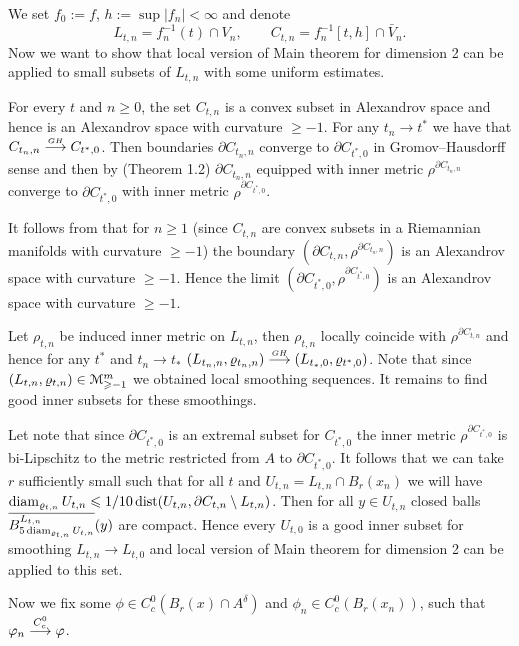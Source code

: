 We set $f_0:=f$, $h:=\sup |f_n|<\infty$
and denote 
$$L_{t,n}=f_n^{-1}(t)\cap V_n,\qquad
C_{t,n}=f_n^{-1}[t,h]\cap \bar V_n.$$
 Now we want to show that local version of
Main theorem  for dimension 2 can be applied to small subsets of $L_{t,n}$ with some uniform estimates.



For every $t$ and $n\ge 0$, the set $C_{t,n}$ is a convex subset in Alexandrov space 
 and hence is an Alexandrov space 
 with curvature $\ge -1$.
For any $t_n\to t^*$ we have that
$C_{t_n,n}     \stackrel{\hbox{\tiny $GH$}}{\longrightarrow}    C_{t^*,0} $. 
Then boundaries  $\partial C_{t_n,n}  $
  converge to $\partial C_{t^*,0}  $ in
Gromov--Hausdorff sense and then by  
  \cite{petrunin-QG} (Theorem 1.2)
 $\partial C_{t_n, n}  $ equipped with inner metric
 $\rho^{\partial C_{t_n,n}}$ converge to
 $\partial C_{t^*,0}  $ with inner metric
 $\rho^{\partial C_{t^*,0}}$.
 
 
 It follows from \cite{AKP} that
 for $n\ge 1$
  (since $C_{t,n}$ are
 convex subsets in a Riemannian manifolds with curvature $\ge -1$)
  the boundary
$(\partial C_{t,n}, \rho^{\partial C_{t_n,n}}) $ is
an Alexandrov space 
 with curvature $\ge -1$. Hence the limit
$(\partial C_{t^*,0}, \rho^{\partial C_{t^*,0}}) $ is
an Alexandrov space 
 with curvature $\ge -1$.

Let $\rho_{t,n}$ be induced inner metric on $L_{t,n}$,
then $\rho_{t,n}$ locally coincide with
$\rho^{\partial C_{t,n}}$ and hence 
for any $t^*$ and $t_n\to t_*$
$(L_{t_n,n}, \varrho_{t_n,n})\stackrel{\hbox{\tiny $GH$}}{\longrightarrow} (L_{t_*,0},\varrho_{t^*,0} )$.
Note that since $(L_{t,n}, \varrho_{t,n})\in\mathcal M_{\geqslant -1}^m$
we obtained
local smoothing sequences. It remains to find good inner
subsets for these smoothings.

Let  note that since 
$\partial C_{t^*,0}$
is an extremal subset for
$C_{t^*,0}$
 the inner metric
$ \rho^{\partial C_{t^*,0}} $ is bi-Lipschitz to
the metric restricted from $A$ to
$\partial C_{t^*,0}$.
It follows that
we can take $r$ sufficiently small
such that for all $t$ and
$U_{t,n}=L_{t,n}\cap B_{r}(x_n)$
we will have
$\operatorname{diam}_{\varrho_{t,n}} U_{t,n}\leqslant 1/10 \operatorname{dist}   (U_{t,n},\partial C_{t,n}\setminus L_{t,n})$. Then for
all $y\in U_{t,n}$ closed balls
$\overline {B^{L_{t,n}}_{5\operatorname{diam}_{\varrho_{t,n}} U_{t,n}}}(y) $ are compact.
Hence every $U_{t,0}$ is a good inner subset for 
smoothing  $L_{t,n}\to L_{t,0}$
and local version of Main theorem for dimension 2
can be applied to this set.

Now we fix some
$\phi\in C^0_c(B_r(x)\cap A^\delta) $ and
$\phi_n\in C^0_c(B_r(x_n)) $,
such that
$\varphi_n\stackrel{C^0_c}{\longrightarrow}\varphi$.


